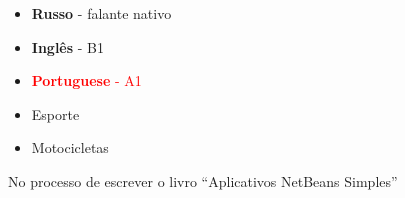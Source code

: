 

\begin{minipage}[t]{0.25\textwidth}
    \vspace{-\baselineskip} %

	\begin{itemize}[leftmargin=.2in]
	\setlength\itemsep{0em}
    	\item \textbf{Russo} - falante nativo
    	\item \textbf{Inglês} - B1
        \item \textcolor{red}{\textbf{Portuguese} - A1}
    \end{itemize}

\end{minipage}
\hfill
\begin{minipage}[t]{0.15\textwidth}
    \vspace{-\baselineskip} %

	\begin{itemize}[leftmargin=.2in]
		\setlength\itemsep{0em}
	    \item Esporte
	    \item Motocicletas
	\end{itemize}

\end{minipage}
\hfill
\begin{minipage}[t]{0.5\textwidth}
    \vspace{-\baselineskip} %


    No processo de escrever o livro \enquote{Aplicativos NetBeans Simples}
\end{minipage}

\vspace{0.5cm}

